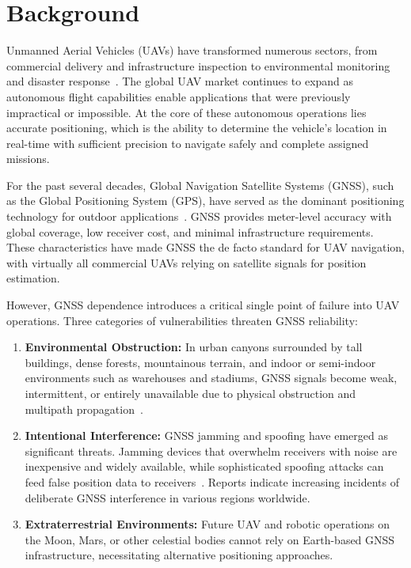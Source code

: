 \documentclass[master,final,11pt]{iscs-thesis}
\begin{document}
\section{Background}
\label{sec:background}

Unmanned Aerial Vehicles (UAVs) have transformed numerous sectors, from commercial delivery and infrastructure inspection to environmental monitoring and disaster response~\cite{ref_surveillance, ref_delivery}.
The global UAV market continues to expand as autonomous flight capabilities enable applications that were previously impractical or impossible.
At the core of these autonomous operations lies accurate positioning, which is the ability to determine the vehicle's location in real-time with sufficient precision to navigate safely and complete assigned missions.

For the past several decades, Global Navigation Satellite Systems (GNSS), such as the Global Positioning System (GPS), have served as the dominant positioning technology for outdoor applications~\cite{ref_gps_analysis}.
GNSS provides meter-level accuracy with global coverage, low receiver cost, and minimal infrastructure requirements.
These characteristics have made GNSS the de facto standard for UAV navigation, with virtually all commercial UAVs relying on satellite signals for position estimation.

However, GNSS dependence introduces a critical single point of failure into UAV operations.
Three categories of vulnerabilities threaten GNSS reliability:

\begin{enumerate}
    \item \textbf{Environmental Obstruction:} In urban canyons surrounded by tall buildings, dense forests, mountainous terrain, and indoor or semi-indoor environments such as warehouses and stadiums, GNSS signals become weak, intermittent, or entirely unavailable due to physical obstruction and multipath propagation~\cite{ref_urban_canyon}.
    
    \item \textbf{Intentional Interference:} GNSS jamming and spoofing have emerged as significant threats. Jamming devices that overwhelm receivers with noise are inexpensive and widely available, while sophisticated spoofing attacks can feed false position data to receivers~\cite{gpsjam}. Reports indicate increasing incidents of deliberate GNSS interference in various regions worldwide.
    
    \item \textbf{Extraterrestrial Environments:} Future UAV and robotic operations on the Moon, Mars, or other celestial bodies cannot rely on Earth-based GNSS infrastructure, necessitating alternative positioning approaches.
\end{enumerate}
\end{document}

